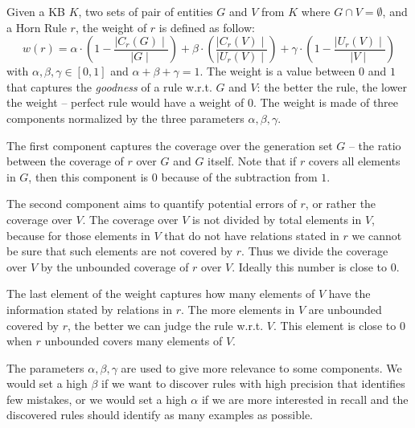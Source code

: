 Given a KB $K$, two sets of pair of entities $G$ and $V$ from $K$ where $G \cap V = \emptyset$, and a Horn Rule $r$, the weight of $r$ is defined as follow:
\begin{equation*}
	w(r) = \alpha \cdot (1-\frac{\mid C_{r}(G)\mid}{\mid G \mid}) +\beta \cdot (\frac{\mid C_{r}(V) \mid}{\mid U_{r}(V)\mid})  +\gamma \cdot (1-\frac{\mid U_{r}(V)\mid}{\mid V \mid})
\end{equation*}
with $\alpha,\beta,\gamma \in [0,1]$ and $\alpha + \beta + \gamma = 1$. The weight is a value between $0$ and $1$ that captures the \emph{goodness} of a rule w.r.t. $G$ and $V$: the better the rule, the lower the weight -- perfect rule would have a weight of $0$. The weight is made of three components normalized by the three parameters $\alpha,\beta,\gamma$.
\begin{inparaenum}[\itshape(i)]
	\item The first component captures the coverage over the generation set $G$ -- the ratio between the coverage of $r$ over $G$ and $G$ itself. Note that if $r$ covers all elements in $G$, then this component is $0$ because of the subtraction from $1$.
	\item The second component aims to quantify potential errors of $r$, or rather the coverage over $V$. The coverage over $V$ is not divided by total elements in $V$, because 
	for those elements in $V$ that do not have relations stated in $r$ we cannot be sure that such elements are not covered by $r$. Thus we divide the coverage over $V$ by the unbounded coverage of $r$ over $V$. Ideally this number is close to $0$.
	\item The last element of the weight captures how many elements of $V$ have the information stated by relations in $r$. The more elements in $V$ are unbounded covered by $r$, the better we can judge the rule w.r.t. $V$. This element is close to $0$ when $r$ unbounded covers many elements of $V$. 
\end{inparaenum}
The parameters $\alpha,\beta,\gamma$ are used to give more relevance to some components. We would set a high $\beta$ if we want to discover rules with high precision that identifies few mistakes, or we would set a high $\alpha$ if we are more interested in recall and the discovered rules should identify as many examples as possible.

